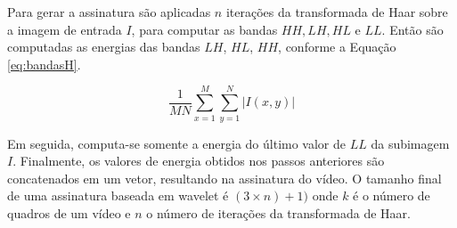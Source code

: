 



 Para gerar a assinatura são aplicadas $n$ iterações da transformada de Haar sobre a imagem de entrada $I$, para computar as bandas $HH, LH, HL$ e $LL$.  Então são computadas as energias das bandas $LH$, $HL$, $HH$, conforme a Equação \ref{eq:bandasH}.
 
 \begin{equation}
	\label{eq:bandasH}
	\frac{1}{MN}\sum_{x=1}^M \sum_{y=1}^N |I(x,y)|
\end{equation} 
 
 
 

 Em seguida, computa-se somente a energia do último valor de $LL$ da subimagem $I$. Finalmente, os valores de energia obtidos nos passos anteriores são concatenados em um vetor, resultando na assinatura do vídeo. O tamanho final de uma assinatura baseada em wavelet é $(3 \times n) + 1)$ onde $k$ é o número de quadros de um vídeo e $n$ o número de iterações da transformada de Haar.

